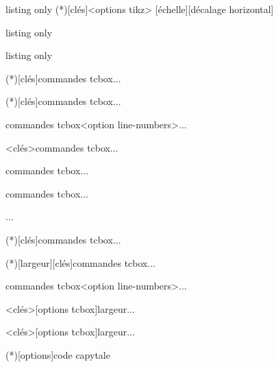 \begin{PresCodeTexPL}{listing only}
\MiniSchemaSignes(*)[clés]<options tikz>
\pflschemasignes
{}[échelle][décalage horizontal]
\pflschemasignestkztab
\end{PresCodeTexPL}

\begin{PresCodeTexPL}{listing only}
\pflintegrapprochtikz
\end{PresCodeTexPL}

\begin{PresCodeTexPL}{listing only}
\begin{CodePythonLst}(*)[clés]{commandes tcbox}...\end{CodePythonLst}
\begin{CodePythonLstAlt}(*)[clés]{commandes tcbox}...\end{CodePythonLstAlt}
\begin{CodePiton}{commandes tcbox}<option line-numbers>...\end{CodePiton}
\begin{PitonConsole}<clés>{commandes tcbox}...\end{PitonConsole}
\begin{CodePythontex}[clés]{commandes tcbox}...\end{CodePythontex}
\begin{CodePythontexAlt}[clés]{commandes tcbox}...\end{CodePythontexAlt}
\begin{ConsolePythontex}[options]{}...\end{ConsolePythontex}
\begin{PseudoCode}(*)[clés]{commandes tcbox}...\end{PseudoCode}
\begin{PseudoCodeAlt}(*)[largeur][clés]{commandes tcbox}...\end{PseudoCodeAlt}
\begin{PseudoCodePiton}[clés]{commandes tcbox}<option line-numbers>...\end{PseudoCodePiton}

\begin{PitonThonnyEditor}<clés>[options tcbox]{largeur}...\end{PitonThonnyEditor}
\begin{PitonThonnyConsole}<clés>[options tcbox]{largeur}...\end{PitonThonnyConsole}

\CartoucheCapytale(*)[options]{code capytale}
\end{PresCodeTexPL}

